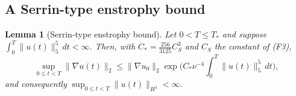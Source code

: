 \documentclass[11pt]{article}
\newtheorem{lemma}[theorem]{Lemma}
\theoremstyle{definition}
\theoremstyle{plain}
\newcommand{\norm}[1]{\lVert #1\rVert}
\begin{document}
\subsection{A Serrin-type enstrophy bound}

\begin{lemma}[Serrin-type enstrophy bound]\label{lem:serrin-enstrophy}
Let $0<T\leq T_*$ and suppose $\int_0^T\norm{u(t)}_5^5\,dt<\infty$.  Then,
with $C_*=\frac{256}{3125}C_S^3$ and $C_S$ the constant of (F3),
\begin{equation}\label{eq:serrin-bound}
 \sup_{0\leq t<T}\norm{\nabla u(t)}_2
 \leq\norm{\nabla u_0}_2\exp\Big(C_*\nu^{-4}\int_0^T\norm{u(t)}_5^5\,dt\Big),
\end{equation}
and consequently $\sup_{0\leq t<T}\norm{u(t)}_{H^1}<\infty$.
\end{lemma}
\end{document}

